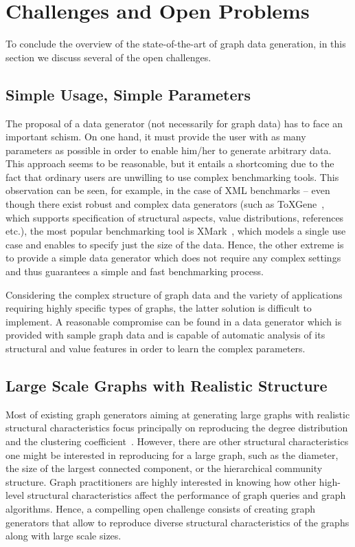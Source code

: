 \section{Challenges and Open Problems}
\label{sec:challenges}

To conclude the  overview of the state-of-the-art of graph data generation, in this section we discuss several of the open challenges.

\subsection{Simple Usage, Simple Parameters}
The proposal of a data generator (not necessarily for graph data) has to face an
important schism. On one hand, it must provide the user with as
many parameters as possible in order to enable him/her to generate
arbitrary data.
This approach seems to be reasonable, but it entails a shortcoming due to
the fact that ordinary users are
unwilling to use complex benchmarking tools. This observation can be
seen, for example, in the case of XML benchmarks -- even though there exist
robust and complex data generators (such as
ToXGene~\cite{conf/webdb/BarbosaMKL02}, which supports specification of
structural aspects, value distributions, references etc.), the most popular
benchmarking tool is XMark~\cite{Schmidt:2002:XBX:1287369.1287455}, which models
a single use case and enables to specify just the size of the data. Hence, the
other extreme is to provide a simple data generator which does not require any
complex settings and thus guarantees a simple and fast benchmarking process.

Considering the complex structure of graph data and the variety of applications
requiring highly specific types of graphs, the latter solution is difficult to
implement. A reasonable compromise can be found in a data generator which is
provided with sample graph data and is capable of automatic analysis of its
structural and value features in order to learn the complex parameters.

\subsection{Large Scale Graphs with Realistic Structure}

Most of existing graph generators aiming at generating large graphs with realistic
structural characteristics focus principally on reproducing the degree
distribution and the clustering
coefficient~\cite{kolda2014scalable,edunov2016darwini}. However, there are other
structural characteristics one might be interested in reproducing for a large
graph, such as the diameter, the size of the largest connected component, or the
hierarchical community structure. Graph practitioners are highly interested in knowing
how other high-level structural characteristics affect the performance of graph
queries and graph algorithms. Hence, a compelling open challenge consists
of creating
graph generators that allow to reproduce diverse structural characteristics
of the graphs along with large scale sizes.

